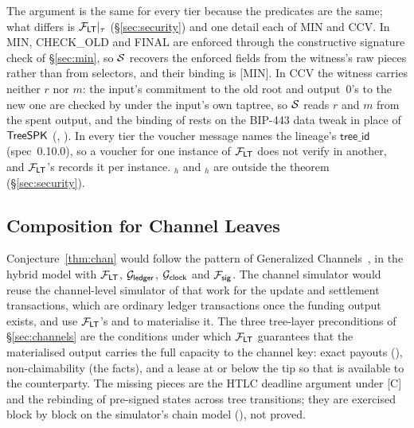 The argument is the same for every tier because the predicates are the
same; what differs is $\mathcal{F}_{\mathsf{LT}}|_\tau$ (\S\ref{sec:security}) and one
detail each of MIN and CCV. In MIN, \textsf{CHECK\_OLD} and
\textsf{FINAL} are enforced through the constructive signature check of
\S\ref{sec:min}, so $\mathcal{S}$ recovers the enforced fields from the witness's
raw pieces rather than from  selectors, and their binding is
[MIN]. In CCV the witness carries neither $r$ nor $m$: the input's
commitment to the old root and output~0's to the new one are checked by
 under the input's own taptree, so $\mathcal{S}$ reads
$r$ and $m$ from the spent output, and the binding of
 rests on the BIP-443 data tweak in place of
$\mathsf{TreeSPK}$ (, ). In every
tier the voucher message names the lineage's $\mathsf{tree\_id}$
(spec~0.10.0), so a voucher for one instance of $\mathcal{F}_{\mathsf{LT}}$ does not verify
in another, and $\mathcal{F}_{\mathsf{LT}}$'s  records it per instance.
$_h$ and $_h$ are outside the theorem
(\S\ref{sec:security}).

\subsection{Composition for Channel Leaves}

Conjecture~\ref{thm:chan} would follow the pattern of Generalized
Channels~\cite{genchannels}, in the hybrid model with $\mathcal{F}_{\mathsf{LT}}$,
$\mathcal{G}_{\mathsf{ledger}}$, $\mathcal{G}_{\mathsf{clock}}$ and $\mathcal{F}_{\mathsf{sig}}$. The channel simulator would reuse the
channel-level simulator of that work for the update and settlement
transactions, which are ordinary ledger transactions once the funding
output exists, and use $\mathcal{F}_{\mathsf{LT}}$'s  and  to
materialise it. The three tree-layer preconditions of
\S\ref{sec:channels} are the conditions under which $\mathcal{F}_{\mathsf{LT}}$ guarantees
that the materialised output carries the full capacity to the channel
key: exact payouts (), non-claimability
(the  facts), and a lease at or below the tip so that
 is available to the counterparty. The missing pieces are
the HTLC deadline argument under [C] and the rebinding of pre-signed
states across tree transitions; they are exercised block by block on the
simulator's chain model (), not proved.
